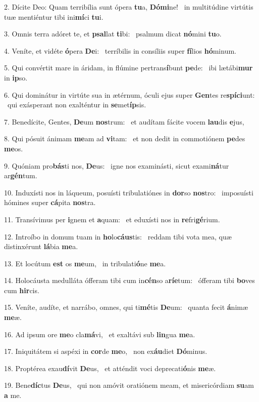 2. Dícite Deo: Quam terribília sunt ópera \textbf{tu}a, \textbf{Dó}\textbf{mi}ne! \ast\  in multitúdine virtútis tuæ mentiéntur tibi ini\textbf{mí}ci \textbf{tu}i.\

3. Omnis terra adóret te, et \textbf{psal}lat \textbf{ti}bi: \ast\  psalmum dicat \textbf{nó}mini \textbf{tu}o.\

4. Veníte, et vidéte \textbf{ó}pera \textbf{De}i: \ast\  terríbilis in consíliis super \textbf{fí}lios \textbf{hó}minum.\

5. Qui convértit mare in áridam, in flúmine pertrans\textbf{í}bunt \textbf{pe}de: \ast\  ibi lætábi\textbf{mur} in \textbf{ip}so.\

6. Qui dominátur in virtúte sua in ætérnum, óculi ejus super \textbf{Gen}tes re\textbf{spí}\textbf{ci}unt: \ast\  qui exásperant non exalténtur in \textbf{se}met\textbf{íp}sis.\

7. Benedícite, Gentes, \textbf{De}um \textbf{nos}trum: \ast\  et audítam fácite vocem \textbf{lau}dis \textbf{e}jus,\

8. Qui pósuit ánimam \textbf{me}am ad \textbf{vi}tam: \ast\  et non dedit in commotiónem \textbf{pe}des \textbf{me}os.\

9. Quóniam pro\textbf{bás}ti nos, \textbf{De}us: \ast\  igne nos examinásti, sicut exami\textbf{ná}tur ar\textbf{gén}tum.\

10. Induxísti nos in láqueum, posuísti tribulatiónes in \textbf{dor}so \textbf{nos}tro: \ast\  imposuísti hómines super \textbf{cá}pita \textbf{nos}tra.\

11. Transívimus per \textbf{i}gnem et \textbf{a}quam: \ast\  et eduxísti nos in \textbf{re}fri\textbf{gé}rium.\

12. Introíbo in domum tuam in \textbf{ho}lo\textbf{cáus}tis: \ast\  reddam tibi vota mea, quæ distinxérunt \textbf{lá}bia \textbf{me}a.\

13. Et locútum \textbf{est} os \textbf{me}um, \ast\  in tribulati\textbf{ó}ne \textbf{me}a.\

14. Holocáusta medulláta ófferam tibi cum in\textbf{cén}so a\textbf{rí}\textbf{e}tum: \ast\  ófferam tibi \textbf{bo}ves cum \textbf{hir}cis.\

15. Veníte, audíte, et narrábo, omnes, qui ti\textbf{mé}tis \textbf{De}um: \ast\  quanta fecit \textbf{á}nimæ \textbf{me}æ.\

16. Ad ipsum ore \textbf{me}o cla\textbf{má}vi, \ast\  et exaltávi sub \textbf{lin}gua \textbf{me}a.\

17. Iniquitátem si aspéxi in \textbf{cor}de \textbf{me}o, \ast\  non ex\textbf{áu}diet \textbf{Dó}minus.\

18. Proptérea exau\textbf{dí}vit \textbf{De}us, \ast\  et atténdit voci deprecati\textbf{ó}nis \textbf{me}æ.\

19. Bene\textbf{díc}tus \textbf{De}us, \ast\  qui non amóvit oratiónem meam, et misericórdiam \textbf{su}am \textbf{a} me.\

